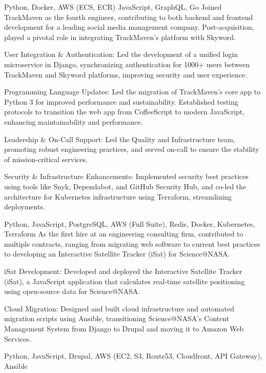 \documentclass{ast_resume}
\begin{document}
{
  Python,
  Docker,
  AWS (ECS, ECR)
  JavaScript,
  GraphQL,
  Go
}
\vspace{1em}
{
  Joined TrackMaven as the fourth engineer, contributing to both backend and frontend development for a leading social media management company. Post-acquisition, played a pivotal role in integrating TrackMaven’s platform with Skyword.
}
{
  \item User Integration \& Authentication: Led the development of a unified login microservice in Django, synchronizing authentication for 1000+ users between TrackMaven and Skyword platforms, improving security and user experience.
  \item Programming Language Updates: Led the migration of TrackMaven’s core app to Python 3 for improved performance and sustainability. Established testing protocols to transition the web app from CoffeeScript to modern JavaScript, enhancing maintainability and performance.
  \item Leadership \& On-Call Support: Led the Quality and Infrastructure team, promoting robust engineering practices, and served on-call to ensure the stability of mission-critical services.
  \item Security \& Infrastructure Enhancements: Implemented security best practices using tools like Snyk, Dependabot, and GitHub Security Hub, and co-led the architecture for Kubernetes infrastructure using Terraform, streamlining deployments.
}
{
  Python,
  JavaScript,
  PostgreSQL,
  AWS (Full Suite),
  Redis,
  Docker,
  Kubernetes,
  Terraform
}
\vspace{1em}
{
  As the first hire at an engineering consulting firm, contributed to multiple contracts, ranging from migrating web software to current best practices to developing an Interactive Satellite Tracker (iSat) for Science@NASA.
}
{
  \item iSat Development: Developed and deployed the Interactive Satellite Tracker (iSat), a JavaScript application that calculates real-time satellite positioning using open-source data for Science@NASA.
  \item Cloud Migration: Designed and built cloud infrastructure and automated migration scripts using Ansible, transitioning Science@NASA’s Content Management System from Django to Drupal and moving it to Amazon Web Services.
}
{
  Python,
  JavaScript,
  Drupal,
  AWS (EC2, S3, Route53, Cloudfront, API Gateway),
  Ansible
}
\end{document}
